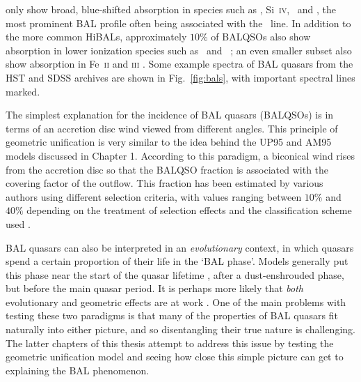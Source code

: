 only show broad, blue-shifted absorption in species such as 
\civ, Si~\textsc{iv}, \nv\ and \ovi, the most prominent BAL
profile often being associated with the \civline\ line.
In addition to the more common HiBALs, 
approximately $10\%$ of BALQSOs also show absorption
in lower ionization species such as \mgii\ and \aliii\ 
\citep[LoBALs;][]{voit1993,gibson2009};
an even smaller subset also show absorption in Fe~\textsc{ii} and 
\textsc{iii} \citep[FeLoBALs;][]{becker2000,hall2002}. 
Some example spectra of BAL quasars from the HST and SDSS archives are shown in 
Fig.~\ref{fig:bals}, with important spectral lines marked.

The simplest explanation for the incidence of 
BAL quasars (BALQSOs) is in terms of an accretion disc wind viewed
from different angles. This principle of geometric unification
is very similar to the idea behind the UP95 and AM95 models discussed in Chapter 1.
According to this paradigm, a biconical wind rises from 
the accretion disc so that the BALQSO fraction is associated with
the covering factor of the outflow. This fraction
has been estimated by various authors using different 
selection criteria, with 
values ranging between $10\%$ and $40\%$ depending on the treatment 
of selection effects and the classification scheme used 
\citep{weymann1991, trump2006, knigge2008, dai2008, allen2011}.

BAL quasars can also be interpreted in an {\em evolutionary}
context, in which quasars spend a certain proportion of their life
in the `BAL phase'. Models generally put this phase near the start
of the quasar lifetime \citep{hazard1984,surdej1987,boroson1992,zubovas2013}, 
after a dust-enshrouded phase, but before
the main quasar period. It is perhaps more likely that {\em both} 
evolutionary and geometric effects are at work \citep{borguet2010,dai2012}.
One of the main problems with testing these two paradigms is that many of
the properties of BAL quasars fit naturally into either picture, and so
disentangling their true nature is challenging. 
The latter chapters of this thesis attempt to address this issue by testing the 
geometric unification model
and seeing how close this simple picture can get to explaining 
the BAL phenomenon.  


